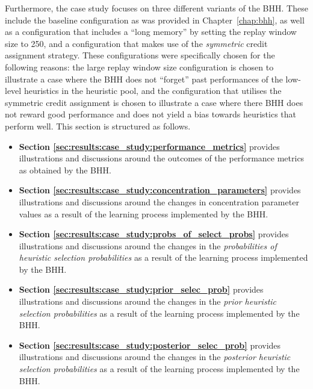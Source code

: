 Furthermore, the case study focuses on three different variants of the \acs{BHH}. These include the baseline configuration as was provided in Chapter~\ref{chap:bhh}, as well as a configuration that includes a ``long memory'' by setting the replay window size to 250, and a configuration that makes use of the \textit{symmetric} credit assignment strategy. These configurations were specifically chosen for the following reasons: the large replay window size configuration is chosen to illustrate a case where the \acs{BHH} does not ``forget'' past performances of the low-level heuristics in the heuristic pool, and the configuration that utilises the symmetric credit assignment is chosen to illustrate a case where there \acs{BHH} does not reward good performance and does not yield a bias towards heuristics that perform well. This section is structured as follows.

\begin{itemize}
	\item \textbf{Section \ref{sec:results:case_study:performance_metrics}} provides illustrations and discussions around the outcomes of the performance metrics as obtained by the \acs{BHH}.

	\item \textbf{Section \ref{sec:results:case_study:concentration_parameters}} provides illustrations and discussions around the changes in concentration parameter values as a result of the learning process implemented by the \acs{BHH}.

	\item \textbf{Section \ref{sec:results:case_study:probs_of_select_probs}} provides illustrations and discussions around the changes in the \textit{probabilities of heuristic selection probabilities} as a result of the learning process implemented by the \acs{BHH}.

	\item \textbf{Section \ref{sec:results:case_study:prior_selec_prob}} provides illustrations and discussions around the changes in the \textit{prior heuristic selection probabilities} as a result of the learning process implemented by the \acs{BHH}.

	\item \textbf{Section \ref{sec:results:case_study:posterior_selec_prob}} provides illustrations and discussions around the changes in the \textit{posterior heuristic selection probabilities} as a result of the learning process implemented by the \acs{BHH}.


\end{itemize}

